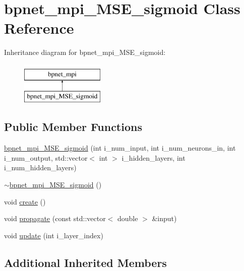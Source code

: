 \hypertarget{classbpnet__mpi__MSE__sigmoid}{\section{bpnet\-\_\-mpi\-\_\-\-M\-S\-E\-\_\-sigmoid Class Reference}
\label{classbpnet__mpi__MSE__sigmoid}
}
Inheritance diagram for bpnet\-\_\-mpi\-\_\-\-M\-S\-E\-\_\-sigmoid\-:\begin{figure}[H]
\begin{center}
\leavevmode
\includegraphics[height=2.000000cm]{classbpnet__mpi__MSE__sigmoid}
\end{center}
\end{figure}
\subsection*{Public Member Functions}
\begin{DoxyCompactItemize}
\item 
\hyperlink{classbpnet__mpi__MSE__sigmoid_a608df0329d1b19ddc8ec88bf5d17534f}{bpnet\-\_\-mpi\-\_\-\-M\-S\-E\-\_\-sigmoid} (int i\-\_\-num\-\_\-input, int i\-\_\-num\-\_\-neurons\-\_\-in, int i\-\_\-num\-\_\-output, std\-::vector$<$ int $>$ i\-\_\-hidden\-\_\-layers, int i\-\_\-num\-\_\-hidden\-\_\-layers)
\item 
\hyperlink{classbpnet__mpi__MSE__sigmoid_a04016adc9cf80f7d927f77f350f73389}{$\sim$bpnet\-\_\-mpi\-\_\-\-M\-S\-E\-\_\-sigmoid} ()
\item 
void \hyperlink{classbpnet__mpi__MSE__sigmoid_a93568732355150e72a91e597d8d1866f}{create} ()
\item 
void \hyperlink{classbpnet__mpi__MSE__sigmoid_afc578987c14f563728cee2a07d68bf7c}{propagate} (const std\-::vector$<$ double $>$ \&input)
\item 
void \hyperlink{classbpnet__mpi__MSE__sigmoid_ab5fd8d812197015deb28bfdd6243c137}{update} (int i\-\_\-layer\-\_\-index)
\end{DoxyCompactItemize}
\subsection*{Additional Inherited Members}


